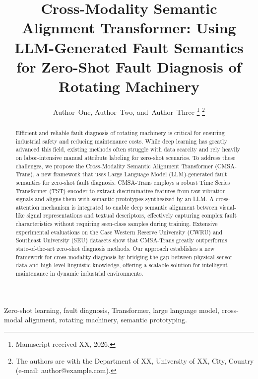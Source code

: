 \documentclass[journal]{IEEEtran}
\begin{document}
\title{Cross-Modality Semantic Alignment Transformer: Using LLM-Generated Fault Semantics for Zero-Shot Fault Diagnosis of Rotating Machinery}

\author{Author~One,
        Author~Two,
        and~Author~Three
\thanks{Manuscript received XX, 2026.}
\thanks{The authors are with the Department of XX, University of XX, City, Country (e-mail: author@example.com).}}


\maketitle

\begin{abstract}
Efficient and reliable fault diagnosis of rotating machinery is critical for ensuring industrial safety and reducing maintenance costs. While deep learning has greatly advanced this field, existing methods often struggle with data scarcity and rely heavily on labor-intensive manual attribute labeling for zero-shot scenarios. To address these challenges, we propose the Cross-Modality Semantic Alignment Transformer (CMSA-Trans), a new framework that uses Large Language Model (LLM)-generated fault semantics for zero-shot fault diagnosis. CMSA-Trans employs a robust Time Series Transformer (TST) encoder to extract discriminative features from raw vibration signals and aligns them with semantic prototypes synthesized by an LLM. A cross-attention mechanism is integrated to enable deep semantic alignment between visual-like signal representations and textual descriptors, effectively capturing complex fault characteristics without requiring seen-class samples during training. Extensive experimental evaluations on the Case Western Reserve University (CWRU) and Southeast University (SEU) datasets show that CMSA-Trans greatly outperforms state-of-the-art zero-shot diagnosis methods. Our approach establishes a new framework for cross-modality diagnosis by bridging the gap between physical sensor data and high-level linguistic knowledge, offering a scalable solution for intelligent maintenance in dynamic industrial environments.
\end{abstract}

\begin{IEEEkeywords}
Zero-shot learning, fault diagnosis, Transformer, large language model, cross-modal alignment, rotating machinery, semantic prototyping.
\end{IEEEkeywords}
\end{document}
